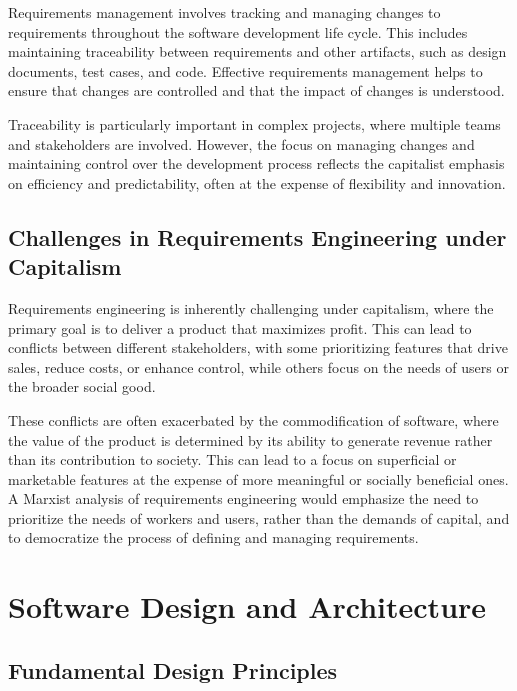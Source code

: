 \begin{refsection}
\begin{multicols}{2}
{Requirements management involves tracking and managing changes to requirements throughout the software development life cycle. This includes maintaining traceability between requirements and other artifacts, such as design documents, test cases, and code. Effective requirements management helps to ensure that changes are controlled and that the impact of changes is understood.

Traceability is particularly important in complex projects, where multiple teams and stakeholders are involved. However, the focus on managing changes and maintaining control over the development process reflects the capitalist emphasis on efficiency and predictability, often at the expense of flexibility and innovation.

\subsection{Challenges in Requirements Engineering under Capitalism}

Requirements engineering is inherently challenging under capitalism, where the primary goal is to deliver a product that maximizes profit. This can lead to conflicts between different stakeholders, with some prioritizing features that drive sales, reduce costs, or enhance control, while others focus on the needs of users or the broader social good.

These conflicts are often exacerbated by the commodification of software, where the value of the product is determined by its ability to generate revenue rather than its contribution to society. This can lead to a focus on superficial or marketable features at the expense of more meaningful or socially beneficial ones. A Marxist analysis of requirements engineering would emphasize the need to prioritize the needs of workers and users, rather than the demands of capital, and to democratize the process of defining and managing requirements.

}
\end{multicols}
\newpage

\section{Software Design and Architecture}
\begin{multicols}{2}
{\small

\subsection{Fundamental Design Principles}

}
\end{multicols}
\end{refsection}
